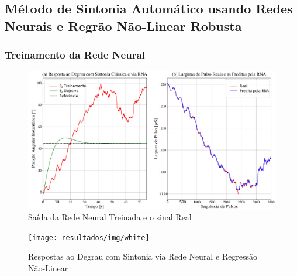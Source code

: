 \subsection{Método de Sintonia Automático usando Redes Neurais e Regrão Não-Linear Robusta}

\subsubsection{Treinamento da Rede Neural}

\begin{figure}[H]
  \caption{Saída da Rede Neural Treinada e o sinal Real}
  \begin{center}
      \includegraphics[scale=0.35]{resultados/img/neural_output}
  \end{center}
  \label{fig:mpu6050_analisys}
\end{figure}

\begin{figure}[H]
  \caption{Respostas ao Degrau com Sintonia via Rede Neural e Regressão Não-Linear}
  \begin{center}
      \texttt{[image: resultados/img/white]}
  \end{center}
  \label{fig:mpu6050_analisys}
\end{figure}


